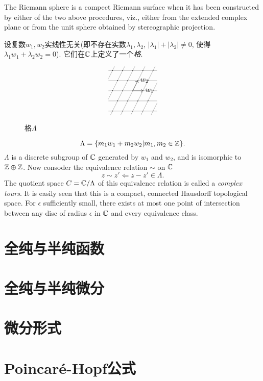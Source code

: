 \begin{example}[The set of extended complex numbers $\Sigma=\C\cup\{\infty\}$ (one point compactification of complex numbers)]
    The Riemann sphere is a compect Riemann surface when it has been constructed by either of the two above procedures, viz., either from the extended complex plane or from the unit sphere obtained by stereographic projection. 
\end{example}
\begin{example}
    设复数$w_1,w_2$实线性无关(即不存在实数$\lambda_1,\lambda_2$, $|\lambda_1|+|\lambda_2|\neq0$, 使得$\lambda_1w_1+\lambda_2w_2=0$). 它们在$\mathbb{C}$上定义了一个\textit{格}. 
    \begin{figure}[h]
        \[\begin{tikzpicture}[cm={1,0,.5,1,(0,0)}]
            \clip[cm={1,0,-.5,1,(0,0)}](-1.2,-1.2)rectangle(1.2,1.2);
            \draw[->](0,0)--(.5,0)node[right]{$w_1$};
            \draw[->](0,0)--(0,.5)node[right]{$w_2$};
            \draw[thin,gray](-2,-2)grid[step=.5](2,2);
            \foreach\x in{-5,...,5}
            \foreach\y in{-5,...,5}
                \fill(\x*.5,\y*.5)circle[radius=.02];
        \end{tikzpicture}\]
        \caption{格$\Lambda$}
    \end{figure}
    \[\Lambda=\{m_1w_1+m_2w_2|m_1,m_2\in\mathbb{Z}\}. \]
    $\Lambda$ is a discrete subgroup of $\mathbb{C}$ generated by $w_1$ and $w_2$, and is isomorphic to $\mathbb{Z}\oplus\mathbb{Z}$. Now consoder the equivalence relation $\sim$ on $\mathbb{C}$ 
    \[z\sim z'\Leftarrow z-z'\in\Lambda. \]
    The quotient space $C=\mathbb{C}/\Lambda$ of this equivalence relation is called a \textit{complex tours}. It is easily seen that this is a compact, connected Hausdorff topological space. For $\epsilon$ sufficiently small, there exists at most one point of intersection between any disc of radius $\epsilon$ in $\mathbb{C}$ and every equivalence class. 
\end{example}

\section{全纯与半纯函数}\label{s1-3}

\section{全纯与半纯微分}\label{s1-4}

\section{微分形式}\label{s1-5}

\section{Poincar\texorpdfstring{\'e}{e}-Hopf公式}\label{s1-6}

